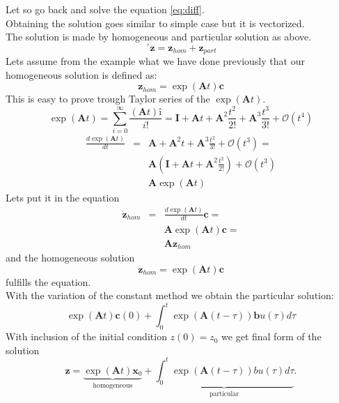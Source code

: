 Let so go back and solve the equation \ref{eq:diff}.\\
Obtaining the solution goes similar to simple case but it is vectorized.\\
The solution is made by homogeneous and particular solution as above.\\
\begin{equation}´
	\mathbf{z}=\mathbf{z}_{hom} + \mathbf{z}_{part}
\end{equation} 
Lets assume from the example what we have done previously that our homogeneous solution is defined as:
\begin{equation}
	\mathbf{z}_{hom}=\exp(\mathbf{A}t)\mathbf{c}
\end{equation}
This is easy to prove trough Taylor series of the $\exp(\mathbf{A}t)$.
\begin{equation}
	\exp(\mathbf{A}t) = \sum^{\infty}_{i=0}\frac{(\mathbf{A}t)î}{i!} = \mathbf{I}+ \mathbf{A}t+\mathbf{A}^2 \frac{t^2}{2!}+ \mathbf{A}^3 \frac{t^3}{3!} + \mathcal{O}(t^4)
\end{equation}
\begin{eqnarray}
	\frac{d\exp(\mathbf{A}t)}{dt} &=& \mathbf{A}+\mathbf{A}^2 t+ \mathbf{A}^3 \frac{t^2}{3!} + \mathcal{O}(t^3)=\\
	&&\mathbf{A}\left(\mathbf{I}+ \mathbf{A}t+\mathbf{A}^2 \frac{t^2}{2!}\right) + \mathcal{O}(t^3)\\
	&&\mathbf{A}\exp(\mathbf{A}t)
\end{eqnarray}
Lets put it in the equation
\begin{eqnarray}
	\dot{\mathbf{z}}_{hom}&=& \frac{d\exp(\mathbf{A}t)}{dt}\mathbf{c} =\\
	&&\mathbf{A}\exp(\mathbf{A}t)\mathbf{c} =\\
	&& \mathbf{A}\mathbf{z}_{hom}
\end{eqnarray}
and the homogeneous solution
\begin{equation}
	\boxed{
	\mathbf{z}_{hom} = \exp(\mathbf{A}t)\mathbf{c}}
\end{equation}
fulfills the equation.\\
With the variation of the constant method we obtain the particular solution:
\begin{equation}
\exp(\mathbf{A}t)\mathbf{c}(0)+ \int^t_0 \exp(\mathbf{A}(t-\tau))\mathbf{b}u(\tau)d\tau
\end{equation}
With inclusion of the initial condition $z(0) = z_0$ we get final form of the solution \\
\begin{equation}
	\boxed{\mathbf{z}= \underbrace{\exp(\mathbf{A}t)\mathbf{x}_0}_\text{homogeneous} + \underbrace{\int^t_0 \exp(\mathbf{A}(t-\tau))bu(\tau)d\tau}_\text{particular}}.
\end{equation}\\
